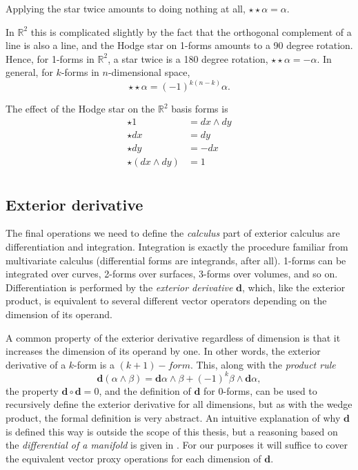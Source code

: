 \documentclass[utf8,english]{gradu3}
\begin{document}
Applying the star twice amounts to doing nothing at all,
$\star\star\alpha = \alpha$.

In $\mathbb{R}^2$ this is complicated slightly by the fact that
the orthogonal complement of a line is also a line,
and the Hodge star on 1-forms amounts to a 90 degree rotation.
Hence, for 1-forms in $\mathbb{R}^2$, a star twice is a 180 degree rotation,
$\star\star\alpha = -\alpha$.
In general, for $k$-forms in $n$-dimensional space,
\[
  \star\star\alpha = (-1)^{k(n-k)}\alpha.
\]

The effect of the Hodge star on the $\mathbb{R}^2$ basis forms is
\begin{align*}
  \star 1 &= dx \wedge dy \\
  \star dx &= dy \\
  \star dy &= -dx \\
  \star (dx \wedge dy) &= 1 \\
\end{align*}


\subsection{Exterior derivative}\label{sec:ext_der}

The final operations we need to define the \textit{calculus} part of exterior calculus
are differentiation and integration.
Integration is exactly the procedure familiar from multivariate calculus
(differential forms are integrands, after all).
1-forms can be integrated over curves, 2-forms over surfaces,
3-forms over volumes, and so on.
Differentiation is performed by the \textit{exterior derivative} $\mathbf{d}$,
which, like the exterior product,
is equivalent to several different vector operators
depending on the dimension of its operand.

A common property of the exterior derivative regardless of dimension
is that it increases the dimension of its operand by one.
In other words, the exterior derivative of a $k$-form is a $(k+1)-form$.
This, along with the \textit{product rule}
\[
  \mathbf{d}(\alpha \wedge \beta)
  = \mathbf{d}\alpha \wedge \beta + (-1)^k \beta \wedge \mathbf{d}\alpha,
\]
the property $\mathbf{d} \circ \mathbf{d} = 0$,
and the definition of $\mathbf{d}$ for 0-forms,
can be used to recursively define the exterior derivative for all dimensions,
but as with the wedge product, the formal definition is very abstract.
An intuitive explanation of why $\mathbf{d}$ is defined this way
is outside the scope of this thesis,
but a reasoning based on the \textit{differential of a manifold}
is given in \cite{crane_digital_2013}.
For our purposes it will suffice to cover the equivalent vector proxy operations
for each dimension of $\mathbf{d}$.
\end{document}
